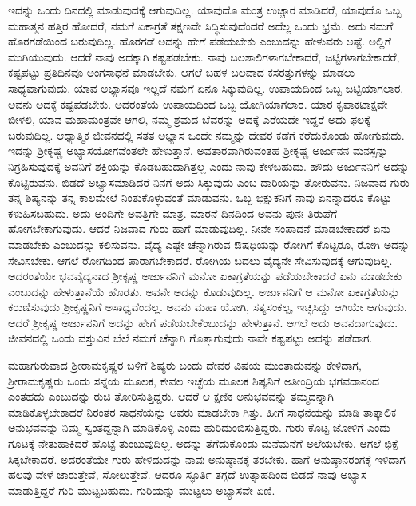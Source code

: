 ಇದನ್ನು ಒಂದು ದಿನದಲ್ಲಿ ಮಾಡುವುದಕ್ಕೆ ಆಗುವುದಿಲ್ಲ. ಯಾವುದೊ ಮಂತ್ರ ಉಚ್ಚಾರ ಮಾಡಿದರೆ, ಯಾವುದೊ ಒಬ್ಬ ಮಹಾತ್ಮನ ಹತ್ತಿರ ಹೋದರೆ, ನಮಗೆ ಏಕಾಗ್ರತೆ ತಕ್ಷಣವೇ ಸಿದ್ಧಿಸುವುದೆಂದರೆ ಅದೆಲ್ಲ ಒಂದು ಭ್ರಮೆ. ಅದು ನಮಗೆ ಹೊರಗಡೆಯಿಂದ ಬರುವುದಿಲ್ಲ. ಹೊರಗಡೆ ಅದನ್ನು ಹೇಗೆ ಪಡೆಯಬೇಕು ಎಂಬುದನ್ನು ಹೇಳುವರು ಅಷ್ಟೆ. ಅಲ್ಲಿಗೆ ಮುಗಿಯುವುದು. ಆದರೆ ನಾವು ಅದಕ್ಕಾಗಿ ಕಷ್ಟಪಡಬೇಕು. ನಾವು ಬಲಶಾಲಿಗಳಾಗಬೇಕಾದರೆ, ಜಟ್ಟಿಗಳಾಗಬೇಕಾದರೆ, ಕಷ್ಟಪಟ್ಟು ಪ್ರತಿದಿನವೂ ಅಂಗಸಾಧನೆ ಮಾಡಬೇಕು. ಆಗಲೆ ಬಹಳ ಬಲವಾದ ಕಸರತ್ತುಗಳನ್ನು ಮಾಡಲು ಸಾಧ್ಯವಾಗುವುದು. ಯಾವ ಅಭ್ಯಾಸವೂ ಇಲ್ಲದೆ ನಮಗೆ ಏನೂ ಸಿಕ್ಕುವುದಿಲ್ಲ. ಉಪಾಯದಿಂದ ಒಬ್ಬ ಜಟ್ಟಿಯಾಗಲಾರ. ಅವನು ಅದಕ್ಕೆ ಕಷ್ಟಪಡಬೇಕು. ಅದರಂತೆಯೆ ಉಪಾಯದಿಂದ ಒಬ್ಬ ಯೋಗಿಯಾಗಲಾರ. ಯಾರ ಕೃಪಾಕಟಾಕ್ಷವೇ ಬೀಳಲಿ, ಯಾವ ಮಹಾಮಂತ್ರವೇ ಆಗಲಿ, ನಮ್ಮ ಶ್ರಮದ ಬೆವರನ್ನು ಅದಕ್ಕೆ ಎರೆಯದೇ ಇದ್ದರೆ ಅದು ಫಲಕ್ಕೆ ಬರುವುದಿಲ್ಲ. ಆಧ್ಯಾತ್ಮಿಕ ಜೀವನದಲ್ಲಿ ಸತತ ಅಭ್ಯಾಸ ಒಂದೇ ನಮ್ಮನ್ನು ದೇವರ ಕಡೆಗೆ ಕರೆದುಕೊಂಡು ಹೋಗುವುದು. ಇದನ್ನು ಶ‍್ರೀಕೃಷ್ಣ ಅಭ್ಯಾಸಯೋಗವೆಂತಲೇ ಹೇಳುತ್ತಾನೆ. ಅವತಾರವಾಗಿರುವಂತಹ ಶ‍್ರೀಕೃಷ್ಣ ಅರ್ಜುನನ ಮನಸ್ಸನ್ನು ನಿಗ್ರಹಿಸುವುದಕ್ಕೆ ಅವನಿಗೆ ಶಕ್ತಿಯನ್ನು ಕೊಡಬಹುದಾಗಿತ್ತಲ್ಲ ಎಂದು ನಾವು ಕೇಳಬಹುದು. ಹೌದು ಅರ್ಜುನನಿಗೆ ಅದನ್ನು ಕೊಟ್ಟಿರುವನು. ಬಿಡದೆ ಅಭ್ಯಾಸಮಾಡಿದರೆ ನಿನಗೆ ಅದು ಸಿಕ್ಕುವುದು ಎಂಬ ದಾರಿಯನ್ನು ತೋರುವನು. ನಿಜವಾದ ಗುರು ತನ್ನ ಶಿಷ್ಯನನ್ನು ತನ್ನ ಕಾಲಮೇಲೆ ನಿಂತುಕೊಳ್ಳುವಂತೆ ಮಾಡುವನು. ಒಬ್ಬ ಭಿಕ್ಷುಕನಿಗೆ ನಾವು ಏನನ್ನಾದರೂ ಕೊಟ್ಟು ಕಳುಹಿಸಬಹುದು. ಅದು ಅಂದಿಗೇ ಅವತ್ತಿಗೇ ಮಾತ್ರ. ಮಾರನೆ ದಿನದಿಂದ ಅವನು ಪುನಃ ತಿರುಪೆಗೆ ಹೋಗಬೇಕಾಗುವುದು. ಆದರೆ ನಿಜವಾದ ಗುರು ಹಾಗೆ ಮಾಡುವುದಿಲ್ಲ. ನೀನೇ ಸಂಪಾದನೆ ಮಾಡಬೇಕಾದರೆ ಏನು ಮಾಡಬೇಕು ಎಂಬುದನ್ನು ಕಲಿಸುವನು. ವೈದ್ಯ ಎಷ್ಟೇ ಚೆನ್ನಾಗಿರುವ ಔಷಧಿಯನ್ನು ರೋಗಿಗೆ ಕೊಟ್ಟರೂ, ರೋಗಿ ಅದನ್ನು ಸೇವಿಸಬೇಕು. ಆಗಲೆ ರೋಗದಿಂದ ಪಾರಾಗಬೇಕಾದರೆ. ರೋಗಿಯ ಬದಲು ವೈದ್ಯನೇ ಸೇವಿಸುವುದಕ್ಕೆ ಆಗುವುದಿಲ್ಲ. ಅದರಂತೆಯೇ ಭವವೈದ್ಯನಾದ ಶ‍್ರೀಕೃಷ್ಣ ಅರ್ಜುನನಿಗೆ ಮನೋ ಏಕಾಗ್ರತೆಯನ್ನು ಪಡೆಯಬೇಕಾದರೆ ಏನು ಮಾಡಬೇಕು ಎಂಬುದನ್ನು ಹೇಳುತ್ತಾನೆಯೆ ಹೊರತು, ಅವನೇ ಅದನ್ನು ಕೊಡುವುದಿಲ್ಲ. ಅರ್ಜುನನಿಗೆ ಆ ಮನೋ ಏಕಾಗ್ರತೆಯನ್ನು ಕರುಣಿಸುವುದು ಶ‍್ರೀಕೃಷ್ಣನಿಗೆ ಅಸಾಧ್ಯವೆಂದಲ್ಲ. ಅವನು ಮಹಾ ಯೋಗಿ, ಸತ್ಯಸಂಕಲ್ಪ, ಇಚ್ಛಿಸಿದ್ದು ಆಗಿಯೇ ಆಗುವುದು. ಆದರೆ ಶ‍್ರೀಕೃಷ್ಣ ಅರ್ಜುನನಿಗೆ ಅದನ್ನು ಹೇಗೆ ಪಡೆಯಬೇಕೆಂಬುದನ್ನು ಹೇಳುತ್ತಾನೆ. ಆಗಲೆ ಅದು ಅವನದಾಗುವುದು. ಜೀವನದಲ್ಲಿ ಒಂದು ವಸ್ತುವಿನ ಬೆಲೆ ನಮಗೆ ಚೆನ್ನಾಗಿ ಗೊತ್ತಾಗುವುದು ನಾವೇ ಕಷ್ಟಪಟ್ಟು ಅದನ್ನು ಪಡೆದಾಗ.

ಮಹಾಗುರುವಾದ ಶ‍್ರೀರಾಮಕೃಷ್ಣರ ಬಳಿಗೆ ಶಿಷ್ಯರು ಬಂದು ದೇವರ ವಿಷಯ ಮುಂತಾದುವನ್ನು ಕೇಳಿದಾಗ, ಶ‍್ರೀರಾಮಕೃಷ್ಣರು ಒಂದು ಸನ್ನೆಯ ಮೂಲಕ, ಕೇವಲ ಇಚ್ಛೆಯ ಮೂಲಕ ಶಿಷ್ಯನಿಗೆ ಅತೀಂದ್ರಿಯ ಭಗವದಾನಂದ ಎಂತಹದು ಎಂಬುದನ್ನು ರುಚಿ ತೋರಿಸುತ್ತಿದ್ದರು. ಆದರೆ ಆ ಕ್ಷಣಿಕ ಅನುಭವವನ್ನು ತಮ್ಮದನ್ನಾಗಿ ಮಾಡಿಕೊಳ್ಳಬೇಕಾದರೆ ನಿರಂತರ ಸಾಧನೆಯನ್ನು ಅವರು ಮಾಡಬೇಕಾ ಗಿತ್ತು. ಹೀಗೆ ಸಾಧನೆಯನ್ನು ಮಾಡಿ ತಾತ್ಕಾಲಿಕ ಅನುಭವವನ್ನು ನಿಮ್ಮ ಸ್ವಂತದ್ದನ್ನಾಗಿ ಮಾಡಿಕೊಳ್ಳಿ ಎಂದು ಹುರಿದುಂಬಿಸುತ್ತಿದ್ದರು. ಗುರು ಕೊಟ್ಟ ಜೋಳಿಗೆ ಎಂದು ಗೂಟಕ್ಕೆ ನೇತುಹಾಕಿದರೆ ಹೊಟ್ಟೆ ತುಂಬುವುದಿಲ್ಲ. ಅದನ್ನು ತೆಗೆದುಕೊಂಡು ಮನೆಮನೆಗೆ ಅಲೆಯಬೇಕು. ಆಗಲೆ ಭಿಕ್ಷೆ ಸಿಕ್ಕಬೇಕಾದರೆ. ಅದರಂತೆಯೇ ಗುರು ಹೇಳಿದುದನ್ನು ನಾವು ಅನುಷ್ಠಾನಕ್ಕೆ ತರಬೇಕು. ಹಾಗೆ ಅನುಷ್ಠಾನರಂಗಕ್ಕೆ ಇಳಿದಾಗ ಹಲವು ವೇಳೆ ಜಾರುತ್ತೇವೆ, ಸೋಲುತ್ತೇವೆ. ಆದರೂ ಸ್ಫೂರ್ತಿ ತಗ್ಗದೆ ಉತ್ಸಾಹದಿಂದ ಬಿಡದೆ ನಾವು ಅಭ್ಯಾಸ ಮಾಡುತ್ತಿದ್ದರೆ ಗುರಿ ಮುಟ್ಟಬಹುದು. ಗುರಿಯನ್ನು ಮುಟ್ಟಲು ಅಭ್ಯಾಸವೇ ಏಣಿ.

